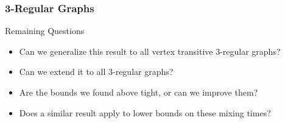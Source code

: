 \documentclass[svgnames,english]{beamer} %
\begin{document}

\begin{frame}
\frametitle{3-Regular Graphs}
\begin{block}{Remaining Questions}
\begin{itemize}
\item Can we generalize this result to all vertex transitive $3$-regular graphs? 
\item Can we extend it to all $3$-regular graphs? 
\item Are the bounds we found above tight, or can we improve them? 
\item Does a similar result apply to lower bounds on these mixing times?
\end{itemize}
\end{block}
\end{frame}
\end{document}
